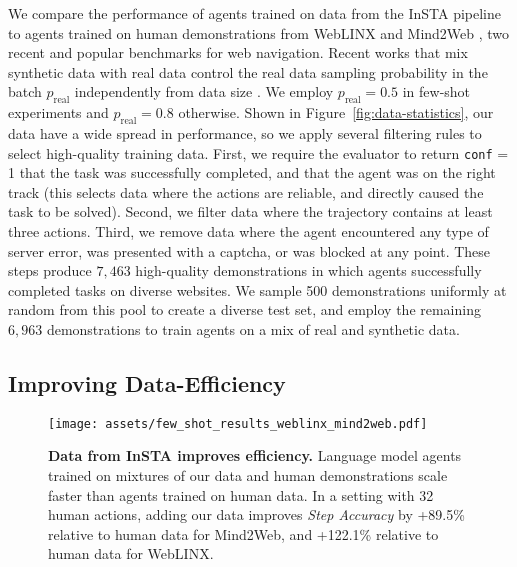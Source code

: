 We compare the performance of agents trained on data from the InSTA pipeline to agents trained on human demonstrations from WebLINX \citep{WebLINX} and Mind2Web \citep{Mind2Web}, two recent and popular benchmarks for web navigation. Recent works that mix synthetic data with real data control the real data sampling probability in the batch $p_{\text{real}}$ independently from data size \citep{DAFusion}. We employ $p_{\text{real}} = 0.5$ in few-shot experiments and $p_{\text{real}} = 0.8$ otherwise. Shown in Figure~\ref{fig:data-statistics}, our data have a wide spread in performance, so we apply several filtering rules to select high-quality training data. First, we require the evaluator to return \texttt{conf} = 1 that the task was successfully completed, and that the agent was on the right track (this selects data where the actions are reliable, and directly caused the task to be solved). Second, we filter data where the trajectory contains at least three actions. Third, we remove data where the agent encountered any type of server error, was presented with a captcha, or was blocked at any point. These steps produce $7,463$ high-quality demonstrations in which agents successfully completed tasks on diverse websites. We sample 500 demonstrations uniformly at random from this pool to create a diverse test set, and employ the remaining $6,963$ demonstrations to train agents on a mix of real and synthetic data.

\subsection{Improving Data-Efficiency}
\label{sec:few-shot}

\begin{wrapfigure}{r}{0.48\textwidth}
    \centering
    \vspace{-0.8cm}
    \texttt{[image: assets/few\_shot\_results\_weblinx\_mind2web.pdf]}
    \vspace{-0.3cm}
    \caption{\small \textbf{Data from InSTA improves efficiency.} Language model agents trained on mixtures of our data and human demonstrations scale faster than agents trained on human data. In a setting with 32 human actions, adding our data improves \textit{Step Accuracy} by +89.5\% relative to human data for Mind2Web, and +122.1\% relative to human data for WebLINX.}
    \vspace{-0.2cm}
    \label{fig:few-shot-results}
\end{wrapfigure}

